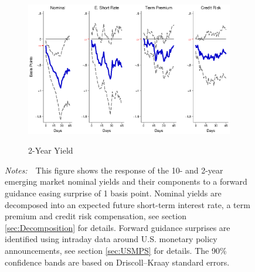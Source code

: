 \documentclass[a4paper, 12pt]{article}
\newcommand{\figtext}[1]{
	\vspace{-1ex}
	\captionsetup{justification=justified,font=footnotesize}
	\caption*{#1}
}
\newcommand{\fignotes}[1]{\figtext{\emph{Notes:~}~#1}}
\begin{document}
\begin{appendices}
\begin{landscape}
\begin{figure}[tbph]
\begin{center}
\begin{minipage}{\linewidth}
\begin{center}
						\begin{subfigure}[t]{\linewidth}
							\includegraphics[trim={0cm 0cm 0cm 0cm},clip,height=0.35\textheight,width=\linewidth]{../Figures/PathEMnomyptpphi24m.eps} \\
							\vspace{-0.35cm}
							\caption{2-Year Yield} \label{subfig:LPEM2YpathWh}
						\end{subfigure}
						\vspace{-0.45cm}
					\end{center}
					\fignotes{This figure shows the response of the 10- and 2-year emerging market nominal yields and their components to a forward guidance easing surprise of 1 basis point. Nominal yields are decomposed into an expected future short-term interest rate, a term premium and credit risk compensation, see section \ref{sec:Decomposition} for details. Forward guidance surprises are identified using intraday data around U.S. monetary policy announcements, see section \ref{sec:USMPS} for details. The 90\% confidence bands are based on Driscoll--Kraay standard errors.}
				\end{minipage}
			\end{center}
		\end{figure}
		
	\end{landscape}
	

\end{appendices}
\end{document}
